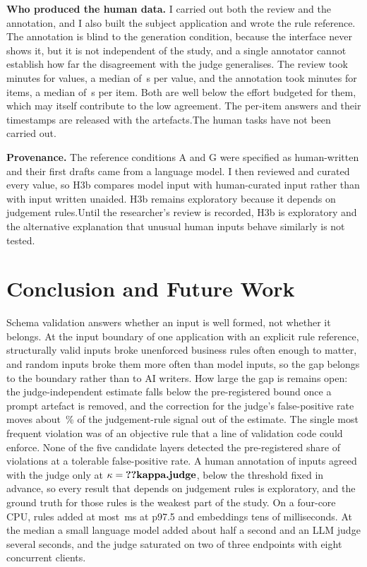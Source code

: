 \documentclass[conference]{IEEEtran}
\begin{document}
\textbf{Who produced the human data.} \ifhumanlabels I carried out both the review and the annotation,
and I also built the subject application and wrote the rule reference. The annotation
is blind to the generation condition, because the interface never shows it, but it is not independent
of the study, and a single annotator cannot establish how far the disagreement with the judge
generalises. The review took  minutes for  values, a median of
\,s per value, and the annotation took  minutes for 
items, a median of \,s per item. Both are well below the effort budgeted for them,
which may itself contribute to the low agreement. The per-item answers and their timestamps are
released with the artefacts.\else The human tasks have not been carried out.\fi

\textbf{Provenance.} The reference conditions A and G were specified as human-written and their
first drafts came from a language model. \ifreviewed I then reviewed and curated every value, so H3b
compares model input with human-curated input rather than with input written unaided. H3b remains
exploratory because it depends on judgement rules.\else Until the researcher's review is recorded, H3b is
exploratory and the alternative explanation that unusual human inputs behave similarly is not
tested.\fi

\section{Conclusion and Future Work}
\label{sec:conclusion}

Schema validation answers whether an input is well formed, not whether it belongs. At the input
boundary of one application with an explicit rule reference, structurally valid inputs broke unenforced
business rules often enough to matter, and random inputs broke them more often than model inputs, so
the gap belongs to the boundary rather than to AI writers. How large the gap is remains open: the
judge-independent estimate falls below the pre-registered bound once a prompt artefact is removed, and
the correction for the judge's false-positive rate moves about \,\% of the
judgement-rule signal out of the estimate. The single most frequent violation was of an objective rule that a line of validation
code could enforce. None of the five candidate layers detected the pre-registered share of violations
at a tolerable false-positive rate.\ifjudgeweak{} A human annotation of  inputs agreed with the judge only at
$\kappa=\R{kappa.judge}$, below the threshold fixed in advance, so every result that depends on
judgement rules is exploratory, and the ground truth for those rules is the weakest part of the
study.\fi{} On a four-core CPU, rules added at most \,ms at p97.5 and embeddings tens
of milliseconds. At the median a small language model added about half a second and an LLM judge
several seconds, and the judge saturated on two of three endpoints with eight concurrent clients.
\end{document}

